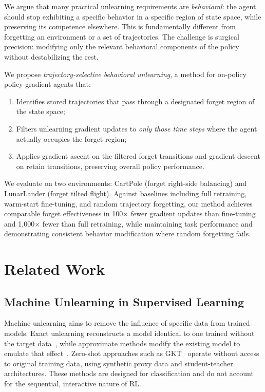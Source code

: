 \documentclass[sigconf]{acmart}
\begin{document}
We argue that many practical unlearning requirements are \emph{behavioral}: the agent should stop exhibiting a specific behavior in a specific region of state space, while preserving its competence elsewhere. This is fundamentally different from forgetting an environment or a set of trajectories. The challenge is surgical precision: modifying only the relevant behavioral components of the policy without destabilizing the rest.

We propose \emph{trajectory-selective behavioral unlearning}, a method for on-policy policy-gradient agents that:
\begin{enumerate}
    \item Identifies stored trajectories that pass through a designated forget region of the state space;
    \item Filters unlearning gradient updates to \emph{only those time steps} where the agent actually occupies the forget region;
    \item Applies gradient ascent on the filtered forget transitions and gradient descent on retain transitions, preserving overall policy performance.
\end{enumerate}

We evaluate on two environments: CartPole (forget right-side balancing) and LunarLander (forget tilted flight). Against baselines including full retraining, warm-start fine-tuning, and random trajectory forgetting, our method achieves comparable forget effectiveness in 100$\times$ fewer gradient updates than fine-tuning and 1{,}000$\times$ fewer than full retraining, while maintaining task performance and demonstrating consistent behavior modification where random forgetting fails.

\section{Related Work}

\subsection{Machine Unlearning in Supervised Learning}

Machine unlearning aims to remove the influence of specific data from trained models. Exact unlearning reconstructs a model identical to one trained without the target data~\cite{ginart2019makingaiforgetyou}, while approximate methods modify the existing model to emulate that effect~\cite{guo2023certifieddataremovalmachine}. Zero-shot approaches such as GKT~\cite{Chundawat_2023} operate without access to original training data, using synthetic proxy data and student-teacher architectures. These methods are designed for classification and do not account for the sequential, interactive nature of RL.
\end{document}
